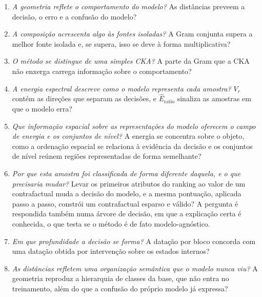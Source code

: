\begin{enumerate}
    \item[\textbf{P1.}] \textit{A geometria reflete o comportamento do modelo?} As distâncias preveem a decisão, o erro e a confusão do modelo?

    \item[\textbf{P2.}] \textit{A composição acrescenta algo às fontes isoladas?} A Gram conjunta supera a melhor fonte isolada e, se supera, isso se deve à forma multiplicativa?

    \item[\textbf{P3.}] \textit{O método se distingue de uma simples CKA?} A parte da Gram que a CKA não enxerga carrega informação sobre o comportamento?

    \item[\textbf{P4.}] \textit{A energia espectral descreve como o modelo representa cada amostra?} $V_r$ contém as direções que separam as decisões, e $\widehat{E}_{\mathrm{ratio}}$ sinaliza as amostras em que o modelo erra?

    \item[\textbf{P5.}] \textit{Que informação espacial sobre as representações do modelo oferecem o campo de energia e os conjuntos de nível?} A energia se concentra sobre o objeto, como a ordenação espacial se relaciona à evidência da decisão e os conjuntos de nível reúnem regiões representadas de forma semelhante?

    \item[\textbf{P6.}] \textit{Por que esta amostra foi classificada de forma diferente daquela, e o que precisaria mudar?} Levar os primeiros atributos do ranking ao valor de um contrafactual muda a decisão do modelo, e a mesma pontuação, aplicada passo a passo, constrói um contrafactual esparso e válido? A pergunta é respondida também numa árvore de decisão, em que a explicação certa é conhecida, o que testa se o método é de fato modelo-agnóstico.

    \item[\textbf{P7.}] \textit{Em que profundidade a decisão se forma?} A datação por bloco concorda com uma datação obtida por intervenção sobre os estados internos?

    \item[\textbf{P8.}] \textit{As distâncias refletem uma organização semântica que o modelo nunca viu?} A geometria reproduz a hierarquia de classes da base, que não entra no treinamento, além do que a confusão do próprio modelo já expressa?
\end{enumerate}

